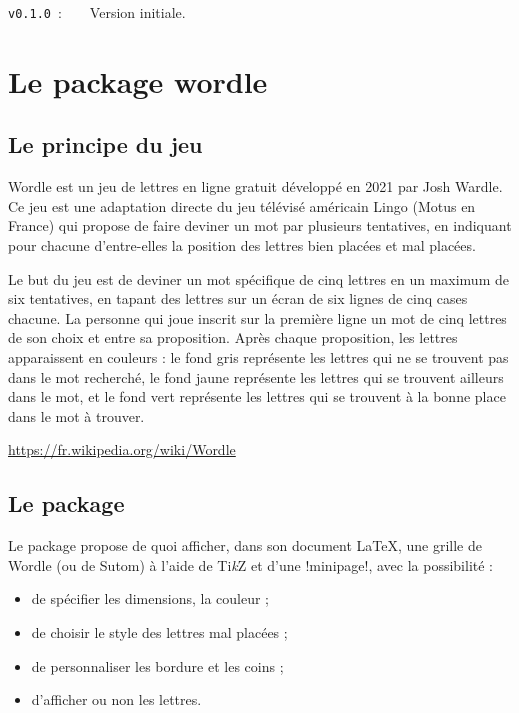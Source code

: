 \documentclass[french,a4paper,11pt]{article}
\providecommand\tikzlogo{Ti\textit{k}Z}
\let\TikZ\tikzlogo
\begin{document}
{\verb|v0.1.0|~:~~~~Version initiale.

\newpage

\section{Le package wordle}

\subsection{Le principe du jeu}

\begin{noteblock}
Wordle est un jeu de lettres en ligne gratuit développé en 2021 par Josh Wardle. Ce jeu est une adaptation directe du jeu télévisé américain Lingo (Motus en France) qui propose de faire deviner un mot par plusieurs tentatives, en indiquant pour chacune d'entre-elles la position des lettres bien placées et mal placées.

Le but du jeu est de deviner un mot spécifique de cinq lettres en un maximum de six tentatives, en tapant des lettres sur un écran de six lignes de cinq cases chacune. La personne qui joue inscrit sur la première ligne un mot de cinq lettres de son choix et entre sa proposition. Après chaque proposition, les lettres apparaissent en couleurs : le fond gris représente les lettres qui ne se trouvent pas dans le mot recherché, le fond jaune représente les lettres qui se trouvent ailleurs dans le mot, et le fond vert représente les lettres qui se trouvent à la bonne place dans le mot à trouver.

\smallskip

\hfill{\scriptsize \url{https://fr.wikipedia.org/wiki/Wordle}}
\end{noteblock}

\subsection{Le package}

\begin{noteblock}
Le package propose de quoi afficher, dans son document \LaTeX, une grille de Wordle (ou de Sutom) à l'aide de \TikZ{} et d'une \motcletex!minipage!, avec la possibilité :

\begin{itemize}
	\item de spécifier les dimensions, la couleur ;
	\item de choisir le style des lettres mal placées ;
	\item de personnaliser les bordure et les coins ;
	\item d'afficher ou non les lettres.
\end{itemize}


\end{noteblock}}
\end{document}
